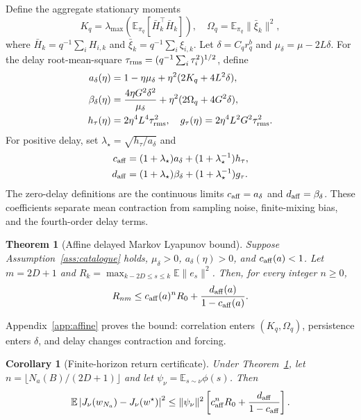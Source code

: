 \documentclass[journal]{IEEEtran}
\newtheorem{theorem}{Theorem}
\newtheorem{corollary}{Corollary}
\newcommand{\E}{\mathbb{E}}
\begin{document}
Define the aggregate stationary moments
\begin{equation}
K_q=\lambda_{\max}\!\left(\E_{\pi_q}[\bar H_k^\top\bar H_k]\right),
\quad
\Omega_q=\E_{\pi_q}\|\bar\xi_k\|^2,
\end{equation}
where $\bar H_k=q^{-1}\sum_iH_{i,k}$ and $\bar\xi_k=q^{-1}\sum_i\xi_{i,k}$.
Let $\delta=C_qr_q^b$ and $\mu_\delta=\mu-2L\delta$.
For the delay root-mean-square $\tau_{\rm rms}=(q^{-1}\sum_i\tau_i^2)^{1/2}$, define
\begin{align}
a_\delta(\eta)&=1-\eta\mu_\delta+\eta^2(2K_q+4L^2\delta),\nonumber\\
\beta_\delta(\eta)&=\frac{4\eta G^2\delta^2}{\mu_\delta}+\eta^2(2\Omega_q+4G^2\delta),\nonumber\\
h_\tau(\eta)&=2\eta^4L^4\tau_{\rm rms}^2,
\quad
g_\tau(\eta)=2\eta^4L^2G^2\tau_{\rm rms}^2.
\label{eq:affine-terms}
\end{align}
For positive delay, set $\lambda_\star=\sqrt{h_\tau/a_\delta}$ and
\begin{align}
c_{\rm aff}&=(1+\lambda_\star)a_\delta+(1+\lambda_\star^{-1})h_\tau,\nonumber\\
d_{\rm aff}&=(1+\lambda_\star)\beta_\delta+(1+\lambda_\star^{-1})g_\tau.
\label{eq:affine-cd}
\end{align}
The zero-delay definitions are the continuous limits $c_{\rm aff}=a_\delta$ and $d_{\rm aff}=\beta_\delta$.
These coefficients separate mean contraction from sampling noise, finite-mixing bias, and the fourth-order delay terms.

\begin{theorem}[Affine delayed Markov Lyapunov bound]
Suppose Assumption~\ref{ass:catalogue} holds, $\mu_\delta>0$, $a_\delta(\eta)>0$, and $c_{\rm aff}(a)<1$.
Let $m=2D+1$ and $R_k=\max_{k-2D\le s\le k}\E\|e_s\|^2$.
Then, for every integer $n\ge0$,
\begin{equation}
R_{nm}\le c_{\rm aff}(a)^nR_0+\frac{d_{\rm aff}(a)}{1-c_{\rm aff}(a)}.
\label{eq:affine-bound}
\end{equation}
\label{thm:affine}
\end{theorem}
Appendix~\ref{app:affine} proves the bound: correlation enters $(K_q,\Omega_q)$, persistence enters $\delta$, and delay changes contraction and forcing.

\begin{corollary}[Finite-horizon return certificate]
Under Theorem~\ref{thm:affine}, let $n=\lfloor N_a(B)/(2D+1)\rfloor$ and let $\psi_\nu=\E_{s\sim\nu}\phi(s)$.
Then
\begin{equation}
\E\left|J_\nu(w_{N_a})-J_\nu(w^\star)\right|^2
\le \|\psi_\nu\|^2
\left[c_{\rm aff}^{n}R_0+\frac{d_{\rm aff}}{1-c_{\rm aff}}\right].
\label{eq:return-certificate}
\end{equation}
\label{cor:return}
\end{corollary}
\end{document}
